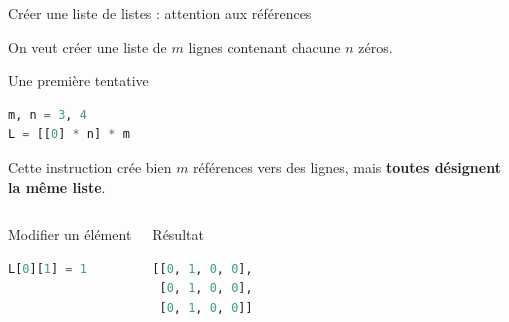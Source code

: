 \documentclass[10pt]{beamer}
\begin{document}
\begin{frame}[fragile]{Créer une liste de listes : attention aux références}

On veut créer une liste de $m$ lignes contenant chacune $n$ zéros.

\begin{exampleblock}{Une première tentative}
\begin{lstlisting}[language=Python]
m, n = 3, 4
L = [[0] * n] * m
\end{lstlisting}
\end{exampleblock}

Cette instruction crée bien $m$ références vers des lignes, mais
\textbf{toutes désignent la même liste}.

\begin{columns}[T,onlytextwidth]

\begin{exampleblock}{Modifier un élément}
\begin{lstlisting}[language=Python]
L[0][1] = 1
\end{lstlisting}
\end{exampleblock}

\pause

\begin{alertblock}{Résultat}
\begin{lstlisting}[language=Python]
[[0, 1, 0, 0],
 [0, 1, 0, 0],
 [0, 1, 0, 0]]
\end{lstlisting}
\end{alertblock}

\centering

\end{columns}
\end{frame}
\end{document}
